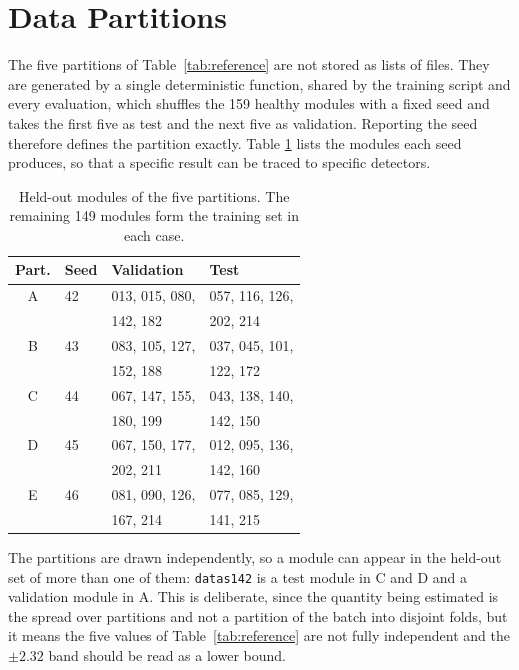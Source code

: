 \documentclass[10pt,conference]{IEEEtran}
\begin{document}
\section{Data Partitions}
\label{app:splits}

The five partitions of Table~\ref{tab:reference} are not stored as lists of
files. They are generated by a single deterministic function, shared by the
training script and every evaluation, which shuffles the 159 healthy modules
with a fixed seed and takes the first five as test and the next five as
validation. Reporting the seed therefore defines the partition exactly. Table
\ref{tab:app-splits} lists the modules each seed produces, so that a specific
result can be traced to specific detectors.

\begin{table}[t]
\centering
\caption{Held-out modules of the five partitions. The remaining 149 modules
form the training set in each case.}
\label{tab:app-splits}
\small
\begin{tabular}{@{}clll@{}}
\toprule
\textbf{Part.} & \textbf{Seed} & \textbf{Validation} & \textbf{Test} \\
\midrule
A & 42 & 013, 015, 080, & 057, 116, 126, \\
  &    & 142, 182       & 202, 214 \\
B & 43 & 083, 105, 127, & 037, 045, 101, \\
  &    & 152, 188       & 122, 172 \\
C & 44 & 067, 147, 155, & 043, 138, 140, \\
  &    & 180, 199       & 142, 150 \\
D & 45 & 067, 150, 177, & 012, 095, 136, \\
  &    & 202, 211       & 142, 160 \\
E & 46 & 081, 090, 126, & 077, 085, 129, \\
  &    & 167, 214       & 141, 215 \\
\bottomrule
\end{tabular}
\end{table}

The partitions are drawn independently, so a module can appear in the held-out
set of more than one of them: \texttt{datas142} is a test module in C and D and
a validation module in A. This is deliberate, since the quantity being
estimated is the spread over partitions and not a partition of the batch into
disjoint folds, but it means the five values of Table~\ref{tab:reference} are
not fully independent and the $\pm 2.32$ band should be read as a lower bound.
\end{document}
